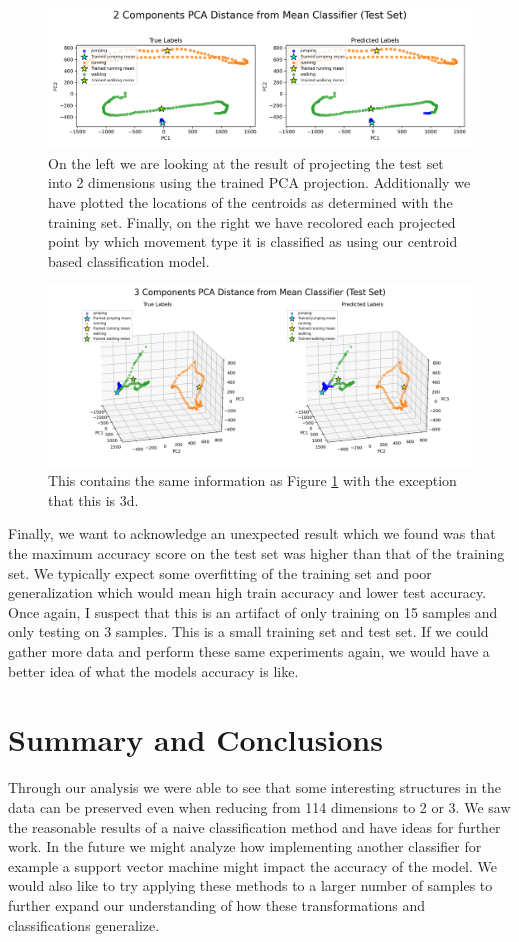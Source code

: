 \documentclass[11pt]{amsart}
\begin{document}
\begin{figure}[h]
	\centering
	\includegraphics[width=.75\textwidth]{../visualizations/pca_distance_from_mean_classifier_2d_test_set.png}
 	\caption{On the left we are looking at the result of projecting the test set into 2 dimensions using the trained PCA projection. Additionally we have plotted the locations of the centroids as determined with the training set.
	Finally, on the right we have recolored each projected point by which movement type it is classified as using our centroid based classification model.}\label{fig:f5}
\end{figure}

\begin{figure}[h]
	\centering
	\includegraphics[width=.75\textwidth]{../visualizations/pca_distance_from_mean_classifier_3d_test_set.png}
 	\caption{This contains the same information as Figure \ref{fig:f5} with the exception that this is 3d.}\label{fig:f6}
\end{figure}

Finally, we want to acknowledge an unexpected result which we found was that the maximum accuracy score on the test set was higher than that of the training set.
We typically expect some overfitting of the training set and poor generalization which would mean high train accuracy and lower test accuracy.
Once again, I suspect that this is an artifact of only training on 15 samples and only testing on 3 samples.
This is a small training set and test set.
If we could gather more data and perform these same experiments again, we would have a better idea of what the models accuracy is like.

\section{Summary and Conclusions}\label{sec:conclusions}
Through our analysis we were able to see that some interesting structures in the data can be preserved even when reducing from 114 dimensions to 2 or 3.
We saw the reasonable results of a naive classification method and have ideas for further work.
In the future we might analyze how implementing another classifier for example a support vector machine might impact the accuracy of the model.
We would also like to try applying these methods to a larger number of samples to further expand our understanding of how these transformations and classifications generalize.
\end{document}
